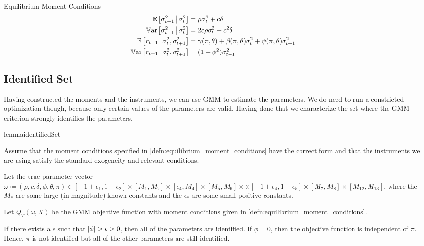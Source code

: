 \documentclass[11pt, letterpaper, twoside, final]{article}
\begin{document}
\begin{defn}{Equilibrium Moment Conditions}
    \label{defn:equilibrium_moment_conditions}
    \begin{align}
        \label{eqn:cond_vol_mean}
        \E\left[\sigma^2_{t+1} \mvert \sigma^2_t \right]  &= \rho \sigma^2_t  + c \delta\\
%
        \label{eqn:cond_vol_var}
        \Var\left[\sigma^2_{t+1} \mvert \sigma^2_t \right]  &=  2 c \rho \sigma^2_t  + c^2 \delta \\
%
        \label{eqn:cond_expected_rtn_moment}
        \E\left[r_{t+1} \mvert \sigma^2_t, \sigma^2_{t+1}\right] &= \gamma(\pi, \theta) + \beta(\pi, \theta)
        \sigma^2_t + \psi(\pi, \theta) \sigma^2_{t+1} \\
%
        \label{eqn:cond_rtn_var}
        \Var\left[r_{t+1} \mvert \sigma^2_t, \sigma^2_{t+1}\right] &= (1 - \phi^2) \sigma^2_{t+1} 
\end{align}
\end{defn}


\subsection{Identified Set}\label{sec:identified_set}

Having constructed the moments and the instruments, we can use GMM to estimate the parameters.
We do need to run a constricted optimization though, because only certain values of the parameters are valid. 
Having done that we characterize the set where the GMM criterion strongly identifies the parameters.

\begin{restatable}{lemma}{identifiedSet}

    Assume that the moment conditions specified in \cref{defn:equilibrium_moment_conditions} have the correct form
    and that the instruments we are using satisfy the standard exogeneity and relevant conditions. 

    Let the true parameter vector $\omega \coloneqq (\rho, c, \delta, \phi, \theta, \pi) \in [-1+\epsilon_1,
    1 - \epsilon_2] \times [M_1, M_2] \times [\epsilon_4, M_4]\times [M_5, M_6]\times \times [-1 +
    \epsilon_4, 1 - \epsilon_5] \times [M_7, M_8] \times [M_12, M_13]$, where the $M_{\ast}$ are some large (in
    magnitude) known constants and the $\epsilon_{\ast}$ are some small positive constants.  

    Let $Q_T(\omega, X)$  be the GMM objective function with moment conditions given in
    \cref{defn:equilibrium_moment_conditions}.  

    If there exists a $\epsilon$ such that $\lvert\phi\rvert > \epsilon > 0$, then all of the parameters are identified. 
    If $\phi = 0$, then the objective function is independent of $\pi$. 
    Hence, $\pi$ is not identified but all of the other parameters are still identified.

\end{restatable}
\end{document}
